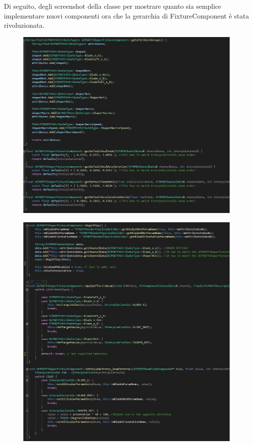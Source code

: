 \documentclass[main.tex]{subfiles}
\begin{document}
\clearpage %
Di seguito, degli screenshot della classe per mostrare quanto sia semplice implementare nuovi componenti ora che la gerarchia di FixtureComponent è stata rivoluzionata.
\begin{figure}[H]
    \centering
    \includegraphics[width=1\linewidth]{img/newFeatures/ShaperComponentCode1.jpg}
    \label{fig:5_ShaperComponentCode1}
\end{figure}
\begin{figure}[H]
    \centering
    \includegraphics[width=1\linewidth]{img/newFeatures/ShaperComponentCode2.jpg}
    \label{fig:5_ShaperComponentCode2}
\end{figure}
\end{document}
